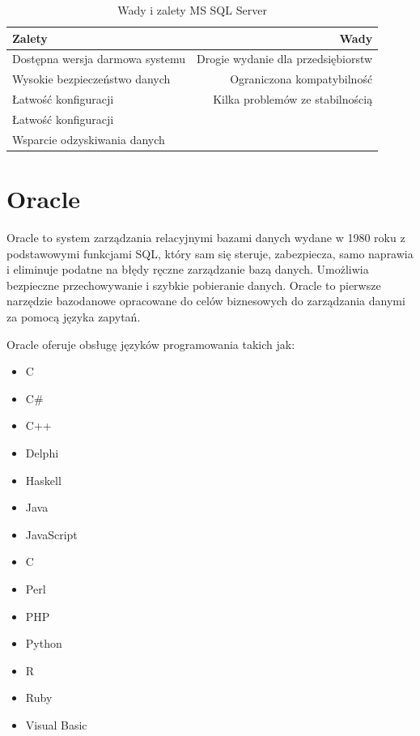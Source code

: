 \documentclass[oneside,polski,logo,indent]{amuthesis}
\begin{document}
\begin{enumerate}
\begin{enumerate}
\begin{table}[h!]
\caption{Wady i zalety MS SQL Server}
\label{tabela-MS SQL Server}
\centering
\begin{adjustbox}{width=1\textwidth}
\small
\begin{tabular}{|l|r|}
\toprule
Zalety & Wady\\
\midrule
Dostępna wersja darmowa systemu & Drogie wydanie dla przedsiębiorstw\\
Wysokie bezpieczeństwo danych & Ograniczona kompatybilność\\
Łatwość konfiguracji & Kilka problemów ze stabilnością\\
Łatwość konfiguracji & \\
Wsparcie odzyskiwania danych & \\
\bottomrule
\end{tabular}
\end{adjustbox}
\end{table}
\section{Oracle}
Oracle to system zarządzania relacyjnymi bazami danych wydane w 1980 roku z podstawowymi funkcjami SQL, który sam się steruje, zabezpiecza, samo naprawia i eliminuje podatne na błędy ręczne zarządzanie bazą danych. Umożliwia bezpieczne przechowywanie i szybkie pobieranie danych. Oracle to pierwsze narzędzie bazodanowe opracowane do celów biznesowych do zarządzania danymi za pomocą języka zapytań. 

Oracle oferuje obsługę języków programowania takich jak: 
\begin{itemize}
\item C 
\item C\# 
\item C++ 
\item Delphi 
\item Haskell 
\item Java 
\item JavaScript 
\item C 
\item Perl 
\item PHP 
\item Python 
\item R 
\item Ruby 
\item Visual Basic 
\end{itemize}


\end{enumerate}
\end{enumerate}
\end{document}
